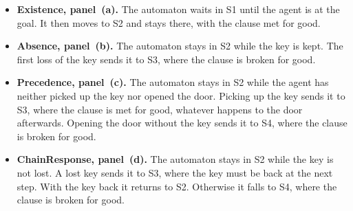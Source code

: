 \documentclass[11pt,english,listoffigures,listoftables]{tfgetsinf}
\begin{document}
\begin{itemize}
    \item \textbf{Existence, panel~(a).} The automaton waits in S1 until the agent is at the goal. It then moves to S2 and stays there, with the clause met for good.
    \item \textbf{Absence, panel~(b).} The automaton stays in S2 while the key is kept. The first loss of the key sends it to S3, where the clause is broken for good.
    \item \textbf{Precedence, panel~(c).} The automaton stays in S2 while the agent has neither picked up the key nor opened the door. Picking up the key sends it to S3, where the clause is met for good, whatever happens to the door afterwards. Opening the door without the key sends it to S4, where the clause is broken for good.
    \item \textbf{ChainResponse, panel~(d).} The automaton stays in S2 while the key is not lost. A lost key sends it to S3, where the key must be back at the next step. With the key back it returns to S2. Otherwise it falls to S4, where the clause is broken for good.
\end{itemize}
\end{document}
